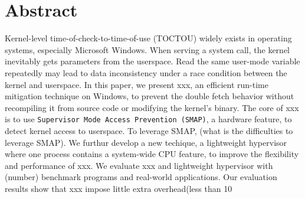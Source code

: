 \section{Abstract}


Kernel-level time-of-check-to-time-of-use (TOCTOU) widely exists in operating systems, especially Microsoft Windows. When serving a system call, the kernel inevitably gets parameters from the userspace. Read the same user-mode variable repeatedly may lead to data inconsistency under a race condition between the kernel and userspace. In this paper, we present xxx, an efficient run-time mitigation technique on Windows, to prevent the double fetch behavior without recompiling it from source code or modifying the kernel's binary. The core of xxx is to use \texttt{Supervisor Mode Access Prevention (SMAP)}, a hardware feature, to detect kernel access to userspace. To leverage SMAP, (what is the difficulties to leverage SMAP).
We furthur develop a new techique, a lightweight hypervisor where one process contains a system-wide CPU feature, to improve the flexibility and performance of xxx. We evaluate xxx and lightweight hypervisor with (number) benchmark programs and real-world applications. Our evaluation results show that xxx impose little extra overhead(less than 10%
